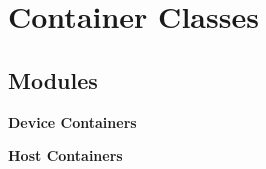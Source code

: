 \section{Container Classes}
\label{group__container__classes}
\subsection*{Modules}
\begin{CompactItemize}
\item 
{\bf Device Containers}
\item 
{\bf Host Containers}
\end{CompactItemize}
